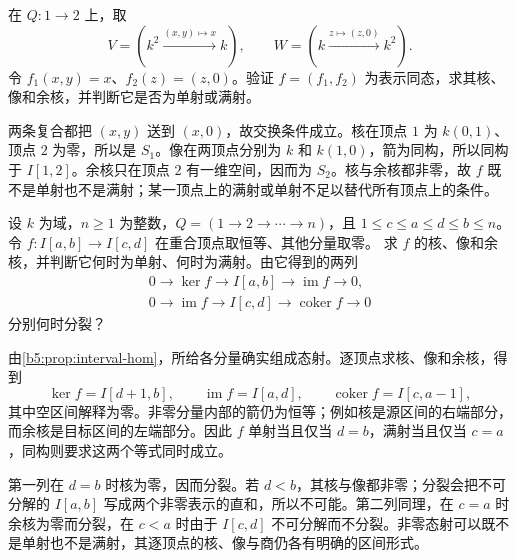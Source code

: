 \begin{exercise}\label{b5:ex:09-kernel-cokernel}
	在 \(Q:1\to2\) 上，取
	\[
		V=\left(k^2\xrightarrow{(x,y)\mapsto x}k\right),\qquad W=\left(k\xrightarrow{z\mapsto(z,0)}k^2\right).
	\]
	令 \(f_1(x,y)=x\)、\(f_2(z)=(z,0)\)。验证 \(f=(f_1,f_2)\) 为表示同态，求其核、像和余核，并判断它是否为单射或满射。
\end{exercise}
\begin{solution}
	两条复合都把 \((x,y)\) 送到 \((x,0)\)，故交换条件成立。核在顶点 \(1\) 为 \(k(0,1)\)、顶点 \(2\) 为零，所以是 \(S_1\)。像在两顶点分别为 \(k\) 和 \(k(1,0)\)，箭为同构，所以同构于 \(I[1,2]\)。余核只在顶点 \(2\) 有一维空间，因而为 \(S_2\)。核与余核都非零，故 \(f\) 既不是单射也不是满射；某一顶点上的满射或单射不足以替代所有顶点上的条件。
\end{solution}

\begin{exercise}\label{b5:ex:09-interval-hom}
	设 \(k\) 为域，\(n\ge1\) 为整数，\(Q=(1\to2\to\cdots\to n)\)，且 \(1\le c\le a\le d\le b\le n\)。令 \(f:I[a,b]\to I[c,d]\) 在重合顶点取恒等、其他分量取零。 求 \(f\) 的核、像和余核，并判断它何时为单射、何时为满射。由它得到的两列
	\[
		\begin{gathered}
			0\longrightarrow\ker f\longrightarrow I[a,b] \longrightarrow\operatorname{im}f\longrightarrow0,\\
			0\longrightarrow\operatorname{im}f\longrightarrow I[c,d] \longrightarrow\operatorname{coker}f\longrightarrow0
		\end{gathered}
	\]
	分别何时分裂？
\end{exercise}
\begin{solution}
	由\cref{b5:prop:interval-hom}，所给各分量确实组成态射。逐顶点求核、像和余核，得到
	\[
		\ker f=I[d+1,b],\qquad \operatorname{im}f=I[a,d],\qquad \operatorname{coker}f=I[c,a-1],
	\]
	其中空区间解释为零。非零分量内部的箭仍为恒等；例如核是源区间的右端部分，而余核是目标区间的左端部分。因此 \(f\) 单射当且仅当 \(d=b\)，满射当且仅当 \(c=a\)，同构则要求这两个等式同时成立。

	第一列在 \(d=b\) 时核为零，因而分裂。若 \(d<b\)，其核与像都非零；分裂会把不可分解的 \(I[a,b]\) 写成两个非零表示的直和，所以不可能。第二列同理，在 \(c=a\) 时余核为零而分裂，在 \(c<a\) 时由于 \(I[c,d]\) 不可分解而不分裂。非零态射可以既不是单射也不是满射，其逐顶点的核、像与商仍各有明确的区间形式。
\end{solution}

